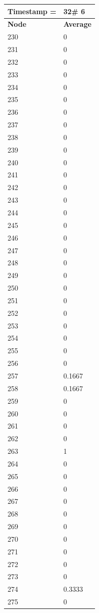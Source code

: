 \begin{tabular}{|l||l|}
\hline
\textbf{Timestamp =} & \textbf{32}\# 6\\\hline
	\textbf{Node} & \textbf{Average} \\ \hline
\hline
	230 & 0 \\ \hline
	231 & 0 \\ \hline
	232 & 0 \\ \hline
	233 & 0 \\ \hline
	234 & 0 \\ \hline
	235 & 0 \\ \hline
	236 & 0 \\ \hline
	237 & 0 \\ \hline
	238 & 0 \\ \hline
	239 & 0 \\ \hline
	240 & 0 \\ \hline
	241 & 0 \\ \hline
	242 & 0 \\ \hline
	243 & 0 \\ \hline
	244 & 0 \\ \hline
	245 & 0 \\ \hline
	246 & 0 \\ \hline
	247 & 0 \\ \hline
	248 & 0 \\ \hline
	249 & 0 \\ \hline
	250 & 0 \\ \hline
	251 & 0 \\ \hline
	252 & 0 \\ \hline
	253 & 0 \\ \hline
	254 & 0 \\ \hline
	255 & 0 \\ \hline
	256 & 0 \\ \hline
	257 & 0.1667 \\ \hline
	258 & 0.1667 \\ \hline
	259 & 0 \\ \hline
	260 & 0 \\ \hline
	261 & 0 \\ \hline
	262 & 0 \\ \hline
	263 & 1 \\ \hline
	264 & 0 \\ \hline
	265 & 0 \\ \hline
	266 & 0 \\ \hline
	267 & 0 \\ \hline
	268 & 0 \\ \hline
	269 & 0 \\ \hline
	270 & 0 \\ \hline
	271 & 0 \\ \hline
	272 & 0 \\ \hline
	273 & 0 \\ \hline
	274 & 0.3333 \\ \hline
	275 & 0 \\ \hline
\end{tabular}

